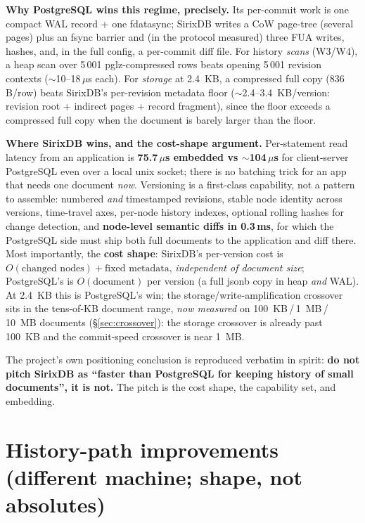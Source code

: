 \documentclass[11pt,a4paper,oneside]{report}
\theoremstyle{sirixthm}
\begin{document}
\textbf{Why PostgreSQL wins this regime, precisely.} Its per-commit work is one compact WAL
record {+} one fdatasync; SirixDB writes a CoW page-tree (several pages) plus an fsync barrier
and (in the protocol measured) three FUA writes, hashes, and, in the full config, a
per-commit diff file. For history \emph{scans} (W3/W4), a heap scan over 5\,001
pglz-compressed rows beats opening 5\,001 revision contexts ($\sim$10--18\,$\mu$s each). For
\emph{storage} at 2.4~KB, a compressed full copy (836\,B/row) beats SirixDB's per-revision
metadata floor ($\sim$2.4--3.4~KB/version: revision root {+} indirect pages {+} record
fragment), since the floor exceeds a compressed full copy when the document is barely larger than
the floor.

\textbf{Where SirixDB wins, and the cost-shape argument.} Per-statement read latency from an
application is \textbf{75.7\,$\mu$s embedded vs $\sim$104\,$\mu$s} for client-server PostgreSQL
even over a local unix socket; there is no batching trick for an app that needs one document
\emph{now}. Versioning is a first-class capability, not a pattern to assemble: numbered
\emph{and} timestamped revisions, stable node identity across versions, time-travel axes,
per-node history indexes, optional rolling hashes for change detection, and \textbf{node-level semantic diffs in
0.3\,ms}, for which the PostgreSQL side must ship both full documents to the application and
diff there. Most importantly, the \textbf{cost shape}: SirixDB's per-version cost is
$O(\text{changed nodes}) + \text{fixed metadata}$, \emph{independent of document size};
PostgreSQL's is $O(\text{document})$ per version (a full jsonb copy in heap \emph{and} WAL). At
2.4~KB this is PostgreSQL's win; the storage/write-amplification crossover sits in
the tens-of-KB document range, \emph{now measured} on 100~KB\,/\,1~MB\,/\,10~MB documents
(\S\ref{sec:crossover}): the storage crossover is already past 100~KB and the commit-speed crossover
is near 1~MB.

The project's own positioning conclusion is reproduced verbatim in spirit: \textbf{do not pitch
SirixDB as ``faster than PostgreSQL for keeping history of small documents'', it is not.}
The pitch is the cost shape, the capability set, and embedding.

\section{History-path improvements (different machine; shape, not absolutes)}
\label{sec:histpath}
\end{document}
